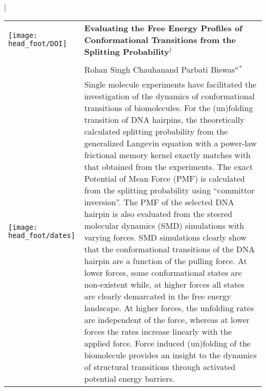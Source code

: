 \documentclass[twoside,twocolumn,9pt]{article}
\begin{document}
\makeatletter 
\newlength{\figrulesep} 
\setlength{\figrulesep}{0.5\textfloatsep} 

\newcommand{\topfigrule}{\vspace*{-1pt}%
\noindent{\color{cream}\rule[-\figrulesep]{\columnwidth}{1.5pt}} }

\newcommand{\botfigrule}{\vspace*{-2pt}%
\noindent{\color{cream}\rule[\figrulesep]{\columnwidth}{1.5pt}} }

\newcommand{\dblfigrule}{\vspace*{-1pt}%
\noindent{\color{cream}\rule[-\figrulesep]{\textwidth}{1.5pt}} }

\makeatother

\twocolumn[
  \begin{@twocolumnfalse}
\vspace{3cm}
\sffamily
\begin{tabular}{m{4.5cm} p{13.5cm} }

\texttt{[image: head\_foot/DOI]} & \noindent\LARGE{\textbf{Evaluating the Free Energy Profiles of Conformational Transitions from the Splitting Probability$^\dag$}} \\
\vspace{0.3cm} & \vspace{0.3cm} \\

 & \noindent\large{Rohan Singh Chauhan}and Parbati Biswas\textit{$^{a\ast}$}} \\

\texttt{[image: head\_foot/dates]} & \noindent\normalsize{
Single molecule experiments have facilitated the investigation of the dynamics of conformational transitions 
of biomolecules. For the (un)folding transition of DNA hairpins, the theoretically calculated splitting probability
from the generalized Langevin equation with a power-law frictional memory kernel
exactly matches with that obtained from the experiments. The exact Potential of Mean Force (PMF) 
is calculated from the splitting probability using ``committor inversion''.
The PMF of the selected DNA hairpin is also evaluated from the steered molecular dynamics (SMD) 
simulations with varying forces. SMD simulations clearly show that the conformational 
transitions of the DNA hairpin are a function of the pulling force.
At lower forces, some conformational states are 
non-existent while, at higher forces all states are clearly demarcated in the free energy landscape.
At higher forces, the unfolding rates are independent of the force, whereas at lower 
forces the rates increase linearly with the applied force. Force induced (un)folding of the biomolecule provides 
an insight to the dynamics of structural transitions through activated potential energy barriers.} 

\end{tabular}

 \end{@twocolumnfalse} \vspace{0.6cm}
\end{document}
